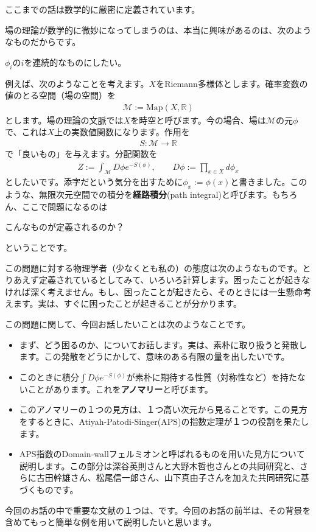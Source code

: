 \documentclass[paper=a4, fontsize=12pt, line_length=16cm, number_of_lines=33,dvipdfmx]{jlreq}
\numberwithin{equation}{section}
\newcommand{\Rb}{\mathbb{R}}
\newcommand{\strong}[1]{\textsf{\bfseries #1}}
\newcommand{\Mcal}{\mathcal{M}}
\newenvironment{myquote}{\begin{tcolorbox}[
  colback = blue!5, after = \noindent] }{\end{tcolorbox}}
\begin{document}
ここまでの話は数学的に厳密に定義されています。

場の理論が数学的に微妙になってしまうのは、本当に興味があるのは、次のようなものだからです。
\begin{myquote}
  $\phi_i$の$i$を連続的なものにしたい。
\end{myquote}
例えば、次のようなことを考えます。$X$をRiemann多様体とします。確率変数の値のとる空間（場の空間）を
\begin{align}
  \Mcal:=\mathrm{Map}(X,\Rb)
\end{align}
とします。場の理論の文脈では$X$を時空と呼びます。今の場合、場は$\Mcal$の元$\phi$で、これは$X$上の実数値関数になります。作用を
\begin{align}
  S:\Mcal \to \Rb
\end{align}
で「良いもの」を与えます。分配関数を
\begin{align}
  Z:=\int_{\Mcal} D\phi e^{-S(\phi)},\qquad D\phi:=\prod_{x\in X}d\phi_{x}
\end{align}
としたいです。添字だという気分を出すために$\phi_x:=\phi(x)$と書きました。このような、無限次元空間での積分を\strong{経路積分}(path integral)と呼びます。もちろん、ここで問題になるのは
\begin{myquote}
  こんなものが定義されるのか？
\end{myquote}
ということです。

この問題に対する物理学者（少なくとも私の）の態度は次のようなものです。とりあえず定義されているとしてみて、いろいろ計算します。困ったことが起きなければ深く考えません。もし、困ったことが起きたら、そのときには一生懸命考えます。実は、すぐに困ったことが起きることが分かります。

この問題に関して、今回お話したいことは次のようなことです。
\begin{itemize}
  \item まず、どう困るのか、についてお話します。実は、素朴に取り扱うと発散します。この発散をどうにかして、意味のある有限の量を出したいです。
  \item このときに積分$\int D\phi e^{-S(\phi)}$が素朴に期待する性質（対称性など）を持たないことがあります。これを\strong{アノマリー}と呼びます。
  \item このアノマリーの１つの見方は、１つ高い次元から見ることです。この見方をするときに、Atiyah-Patodi-Singer(APS)の指数定理が１つの役割を果たします。
  \item APS指数のDomain-wallフェルミオンと呼ばれるものを用いた見方について説明します。この部分は深谷英則さんと大野木哲也さんとの共同研究\cite{Fukaya:2017tsq}と、さらに古田幹雄さん、松尾信一郎さん、山下真由子さんを加えた共同研究\cite{Fukaya:2019qlf}に基づくものです。
\end{itemize}
今回のお話の中で重要な文献の１つは、\cite{Witten:2015aba}です。今回のお話の前半は、その背景を含めてもっと簡単な例を用いて説明したいと思います。
\end{document}
